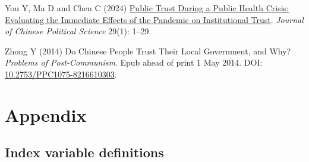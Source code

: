 \documentclass[
  letterpaper,
  DIV=11,
  numbers=noendperiod]{scrartcl}
\newlength{\cslhangindent}
\newenvironment{CSLReferences}[2] %
 {\begin{list}{}{%
  \setlength{\itemindent}{0pt}
  \setlength{\leftmargin}{0pt}
  \setlength{\parsep}{0pt}
  \ifodd #1
   \setlength{\leftmargin}{\cslhangindent}
   \setlength{\itemindent}{-1\cslhangindent}
  \fi
  \setlength{\itemsep}{#2\baselineskip}}}
 {\end{list}}
\begin{document}
\begin{CSLReferences}{1}{1}
You Y, Ma D and Chen C (2024)
\href{https://doi.org/10.1007/s11366-023-09874-y}{Public Trust During a
Public Health Crisis: Evaluating the Immediate Effects of the Pandemic
on Institutional Trust}. \emph{Journal of Chinese Political Science}
29(1): 1--29.

Zhong Y (2014) Do Chinese People Trust Their Local Government, and Why?
\emph{Problems of Post-Communism}. Epub ahead of print 1 May 2014. DOI:
\href{https://doi.org/10.2753/PPC1075-8216610303}{10.2753/PPC1075-8216610303}.

\end{CSLReferences}

\newpage{}

\section{Appendix}\label{sec-appendix}

\subsection{Index variable
definitions}\label{index-variable-definitions}
\end{document}
